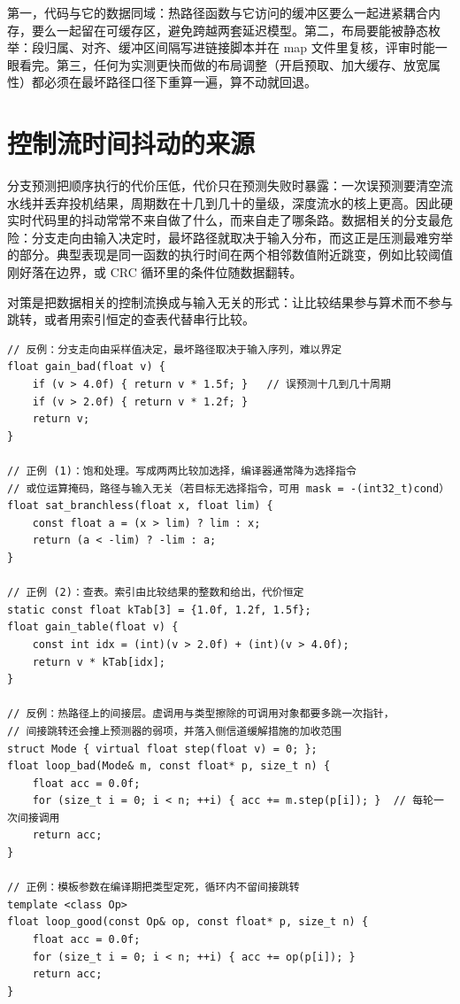 \documentclass[12pt,a4paper,fontset=fandol]{ctexbook}
\begin{document}
\begin{guideline}[title={关键路径的存储布局三条纪律}]
第一，代码与它的数据同域：热路径函数与它访问的缓冲区要么一起进紧耦合内存，要么一起留在可缓存区，避免跨越两套延迟模型。第二，布局要能被静态枚举：段归属、对齐、缓冲区间隔写进链接脚本并在 map 文件里复核，评审时能一眼看完。第三，任何为实测更快而做的布局调整（开启预取、加大缓存、放宽属性）都必须在最坏路径口径下重算一遍，算不动就回退。
\end{guideline}

\section{控制流时间抖动的来源}
\label{sec:ch13-ctrlflow}

分支预测把顺序执行的代价压低，代价只在预测失败时暴露：一次误预测要清空流水线并丢弃投机结果，周期数在十几到几十的量级，深度流水的核上更高。因此硬实时代码里的抖动常常不来自做了什么，而来自走了哪条路。数据相关的分支最危险：分支走向由输入决定时，最坏路径就取决于输入分布，而这正是压测最难穷举的部分。典型表现是同一函数的执行时间在两个相邻数值附近跳变，例如比较阈值刚好落在边界，或 CRC 循环里的条件位随数据翻转。

对策是把数据相关的控制流换成与输入无关的形式：让比较结果参与算术而不参与跳转，或者用索引恒定的查表代替串行比较。

\begin{lstlisting}[style=cppstyle,caption={C++：用选择与查表替代数据相关分支，并消除热路径的间接层},label={lst:ch13-hotpath}]
// 反例：分支走向由采样值决定，最坏路径取决于输入序列，难以界定
float gain_bad(float v) {
    if (v > 4.0f) { return v * 1.5f; }   // 误预测十几到几十周期
    if (v > 2.0f) { return v * 1.2f; }
    return v;
}

// 正例 (1)：饱和处理。写成两两比较加选择，编译器通常降为选择指令
// 或位运算掩码，路径与输入无关（若目标无选择指令，可用 mask = -(int32_t)cond）
float sat_branchless(float x, float lim) {
    const float a = (x > lim) ? lim : x;
    return (a < -lim) ? -lim : a;
}

// 正例 (2)：查表。索引由比较结果的整数和给出，代价恒定
static const float kTab[3] = {1.0f, 1.2f, 1.5f};
float gain_table(float v) {
    const int idx = (int)(v > 2.0f) + (int)(v > 4.0f);
    return v * kTab[idx];
}

// 反例：热路径上的间接层。虚调用与类型擦除的可调用对象都要多跳一次指针，
// 间接跳转还会撞上预测器的弱项，并落入侧信道缓解措施的加收范围
struct Mode { virtual float step(float v) = 0; };
float loop_bad(Mode& m, const float* p, size_t n) {
    float acc = 0.0f;
    for (size_t i = 0; i < n; ++i) { acc += m.step(p[i]); }  // 每轮一次间接调用
    return acc;
}

// 正例：模板参数在编译期把类型定死，循环内不留间接跳转
template <class Op>
float loop_good(const Op& op, const float* p, size_t n) {
    float acc = 0.0f;
    for (size_t i = 0; i < n; ++i) { acc += op(p[i]); }
    return acc;
}
\end{lstlisting}
\end{document}
